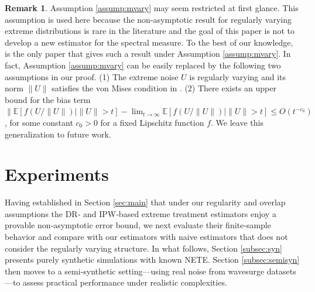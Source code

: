 \documentclass[12pt]{article}
\theoremstyle{plain}
\theoremstyle{definition}
\newtheorem{remark}[theorem]{Remark}
\begin{document}

\begin{remark}
  Assumption \ref{assump:mvary} may seem restricted at first glance. This assumption is used here because the non-asymptotic result for regularly varying extreme distributions is rare in the literature and the goal of this paper is not to develop a new estimator for the spectral measure. To the best of our knowledge, {\cite{zhang2023wasserstein}} is the only paper that gives such a result under Assumption \ref{assump:mvary}. In fact, Assumption \ref{assump:mvary} can be easily replaced by the following two assumptions in our proof. (1) The extreme noise $U$ is regularly varying and its norm $\|U\|$ satisfies the von Mises condition in {\cite{boucheron2015tail}}. (2) There exists an upper bound for the bias term $ \| \mathbb{E} [f(U/\|U\|) \mid \|U\|>t] - \lim_{t\rightarrow\infty}\mathbb{E} [f(U/\|U\|) \mid \|U\|>t]\leqslant O(t^{- c_0})$, for some constant $c_0 > 0$ for a fixed Lipschitz function $f$. We leave this generalization to future work.
\end{remark}

\section{Experiments}\label{sec:exp}
Having established in Section \ref{sec:main} that under our regularity and overlap assumptions the DR‐ and IPW‐based extreme treatment estimators enjoy a provable non‑asymptotic error bound, we next evaluate their finite‑sample behavior and compare with our estimators with naive estimators that does not consider the regularly varying structure. In what follows, Section \ref{subsec:syn} presents purely synthetic simulations with known NETE. Section \ref{subsec:semisyn} then moves to a semi‑synthetic setting—using real noise from wavesurge datasets—to assess practical performance under realistic complexities.
\end{document}
